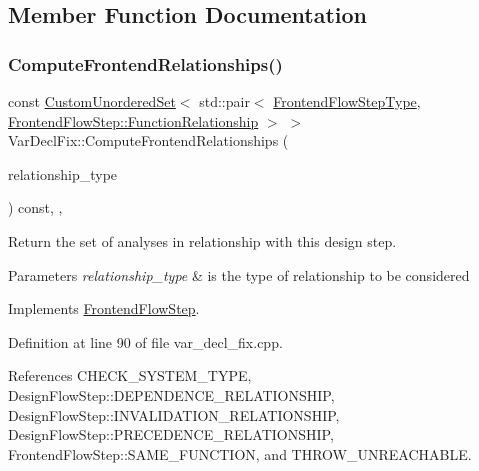 \subsection{Member Function Documentation}
\mbox{\label{classVarDeclFix_a7262f23287cc6f446ab8de503ecac130}} 
\subsubsection{\texorpdfstring{Compute\+Frontend\+Relationships()}{ComputeFrontendRelationships()}}
{\footnotesize\ttfamily const \hyperlink{classCustomUnorderedSet}{Custom\+Unordered\+Set}$<$ std\+::pair$<$ \hyperlink{frontend__flow__step_8hpp_afeb3716c693d2b2e4ed3e6d04c3b63bb}{Frontend\+Flow\+Step\+Type}, \hyperlink{classFrontendFlowStep_af7cf30f2023e5b99e637dc2058289ab0}{Frontend\+Flow\+Step\+::\+Function\+Relationship} $>$ $>$ Var\+Decl\+Fix\+::\+Compute\+Frontend\+Relationships (\begin{DoxyParamCaption}\item[{const \hyperlink{classDesignFlowStep_a723a3baf19ff2ceb77bc13e099d0b1b7}{Design\+Flow\+Step\+::\+Relationship\+Type}}]{relationship\+\_\+type }\end{DoxyParamCaption}) const\hspace{0.3cm}{\ttfamily [override]}, {\ttfamily [protected]}, {\ttfamily [virtual]}}



Return the set of analyses in relationship with this design step. 


\begin{DoxyParams}{Parameters}
{\em relationship\+\_\+type} & is the type of relationship to be considered \\
\hline
\end{DoxyParams}


Implements \hyperlink{classFrontendFlowStep_abeaff70b59734e462d347ed343dd700d}{Frontend\+Flow\+Step}.



Definition at line 90 of file var\+\_\+decl\+\_\+fix.\+cpp.



References C\+H\+E\+C\+K\+\_\+\+S\+Y\+S\+T\+E\+M\+\_\+\+T\+Y\+PE, Design\+Flow\+Step\+::\+D\+E\+P\+E\+N\+D\+E\+N\+C\+E\+\_\+\+R\+E\+L\+A\+T\+I\+O\+N\+S\+H\+IP, Design\+Flow\+Step\+::\+I\+N\+V\+A\+L\+I\+D\+A\+T\+I\+O\+N\+\_\+\+R\+E\+L\+A\+T\+I\+O\+N\+S\+H\+IP, Design\+Flow\+Step\+::\+P\+R\+E\+C\+E\+D\+E\+N\+C\+E\+\_\+\+R\+E\+L\+A\+T\+I\+O\+N\+S\+H\+IP, Frontend\+Flow\+Step\+::\+S\+A\+M\+E\+\_\+\+F\+U\+N\+C\+T\+I\+ON, and T\+H\+R\+O\+W\+\_\+\+U\+N\+R\+E\+A\+C\+H\+A\+B\+LE.

